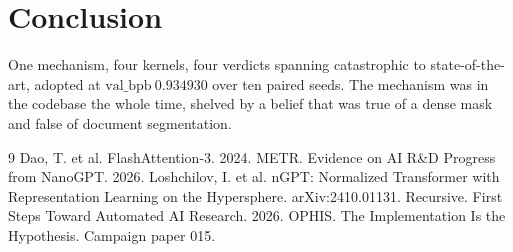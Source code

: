 \documentclass{article}
\newcommand{\valbpb}{\mathrm{val\_bpb}}
\begin{document}
\section{Conclusion}
One mechanism, four kernels, four verdicts spanning catastrophic to state-of-the-art, adopted at $\valbpb\ 0.934930$ over ten paired seeds. The mechanism was in the codebase the whole time, shelved by a belief that was true of a dense mask and false of document segmentation.


\begin{thebibliography}{9}
 Dao, T. et al. FlashAttention-3. 2024.
 METR. Evidence on AI R\&D Progress from NanoGPT. 2026.
 Loshchilov, I. et al. nGPT: Normalized Transformer with Representation Learning on the Hypersphere. arXiv:2410.01131.
 Recursive. First Steps Toward Automated AI Research. 2026.
 OPHIS. The Implementation Is the Hypothesis. Campaign paper 015.
\end{thebibliography}
\end{document}
